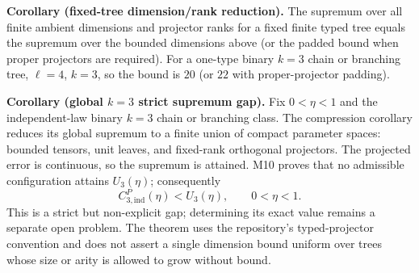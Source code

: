 \textbf{Corollary (fixed-tree dimension/rank reduction).}  The supremum over
all finite ambient dimensions and projector ranks for a fixed finite typed
tree equals the supremum over the bounded dimensions above (or the padded
bound when proper projectors are required).  For a one-type binary $k=3$
chain or branching tree, $\ell=4$, $k=3$, so the bound is $20$ (or $22$ with
proper-projector padding).

\textbf{Corollary (global $k=3$ strict supremum gap).}  Fix $0<\eta<1$ and
the independent-law binary $k=3$ chain or branching class.  The compression
corollary reduces its global supremum to a finite union of compact parameter
spaces: bounded tensors, unit leaves, and fixed-rank orthogonal projectors.
The projected error is continuous, so the supremum is attained.  M10 proves
that no admissible configuration attains $U_3(\eta)$; consequently
\[
  C_{3,\mathrm{ind}}^P(\eta)<U_3(\eta),\qquad 0<\eta<1.
\]
This is a strict but non-explicit gap; determining its exact value remains a
separate open problem.  The theorem uses the repository's typed-projector
convention and does not assert a single dimension bound uniform over trees
whose size or arity is allowed to grow without bound.
